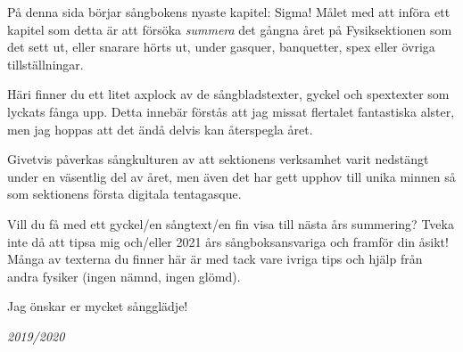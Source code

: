 \documentclass[a6paper,10pt]{article}
\begin{document}
\noindent
{}
\small
\vspace{10pt}

\noindent
På denna sida börjar sångbokens nyaste kapitel: Sigma! Målet med att införa ett kapitel som detta är att försöka \textit{summera} det gångna året på Fysiksektionen som det sett ut, eller snarare hörts ut, under gasquer, banquetter, spex eller övriga tillställningar. 

Häri finner du ett litet axplock av de sångbladstexter, gyckel och spextexter som lyckats fånga upp. Detta innebär förstås att jag missat flertalet fantastiska alster, men jag hoppas att det ändå delvis  kan återspegla året.

Givetvis påverkas sångkulturen av att sektionens verksamhet varit nedstängt under en väsentlig del av året, men även det har gett upphov till unika minnen så som sektionens första digitala tentagasque.

Vill du få med ett gyckel/en sångtext/en fin visa till nästa års summering? Tveka inte då att tipsa mig och/eller 2021 års sångboksansvariga och framför din åsikt! Många av texterna du finner här är med tack vare ivriga tips och hjälp från andra fysiker (ingen nämnd, ingen glömd). 

Jag önskar er mycket sångglädje! 
\setlength{\oddsidemargin}{-0.47in}

\begin{center}
\huge{\textit{2019/2020}}
\end{center}
\end{document}
